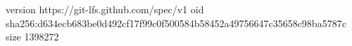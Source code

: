 version https://git-lfs.github.com/spec/v1
oid sha256:d634ecb683be0d492cf17f99c0f500584b58452a49756647c35658c98ba5787c
size 1398272
